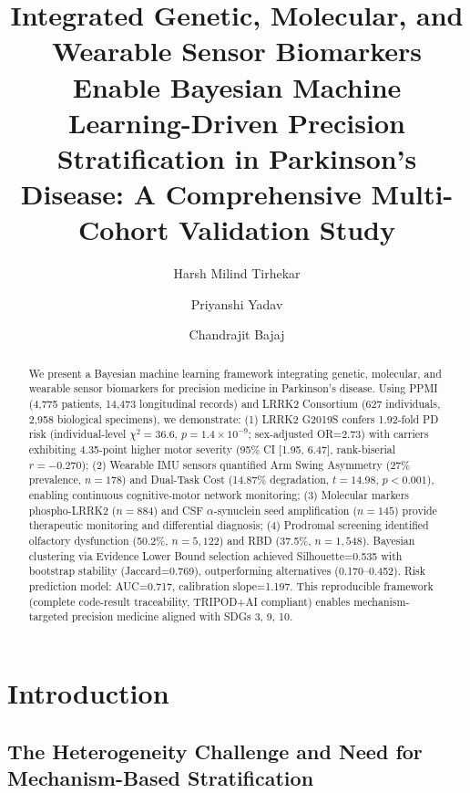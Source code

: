 \documentclass[11pt]{article}
\title{\textbf{Integrated Genetic, Molecular, and Wearable Sensor Biomarkers Enable Bayesian Machine Learning-Driven Precision Stratification in Parkinson's Disease: A Comprehensive Multi-Cohort Validation Study}}
\author{Harsh Milind Tirhekar}
\author{Priyanshi Yadav}
\author{Chandrajit Bajaj}
\affil{Computational Visualization Center, Oden Institute for Computational Engineering Sciences, The University of Texas at Austin, Austin, TX 78712, USA}
\affil[*]{Correspondence: bajaj@utexas.edu}
\date{}
\begin{document}
\maketitle

\begin{abstract}
We present a Bayesian machine learning framework integrating genetic, molecular, and wearable sensor biomarkers for precision medicine in Parkinson's disease. Using PPMI (4,775 patients, 14,473 longitudinal records) and LRRK2 Consortium (627 individuals, 2,958 biological specimens), we demonstrate: (1) LRRK2 G2019S confers 1.92-fold PD risk (individual-level $\chi^2=36.6$, $p=1.4\times10^{-9}$; sex-adjusted OR=2.73) with carriers exhibiting 4.35-point higher motor severity (95\% CI [1.95, 6.47], rank-biserial $r=-0.270$); (2) Wearable IMU sensors quantified Arm Swing Asymmetry (27\% prevalence, $n=178$) and Dual-Task Cost (14.87\% degradation, $t=14.98$, $p<0.001$), enabling continuous cognitive-motor network monitoring; (3) Molecular markers phospho-LRRK2 ($n=884$) and CSF $\alpha$-synuclein seed amplification ($n=145$) provide therapeutic monitoring and differential diagnosis; (4) Prodromal screening identified olfactory dysfunction (50.2\%, $n=5,122$) and RBD (37.5\%, $n=1,548$). Bayesian clustering via Evidence Lower Bound selection achieved Silhouette=0.535 with bootstrap stability (Jaccard=0.769), outperforming alternatives (0.170--0.452). Risk prediction model: AUC=0.717, calibration slope=1.197. This reproducible framework (complete code-result traceability, TRIPOD+AI compliant) enables mechanism-targeted precision medicine aligned with SDGs 3, 9, 10.
\end{abstract}

\section{Introduction}

\subsection*{The Heterogeneity Challenge and Need for Mechanism-Based Stratification}
\end{document}
